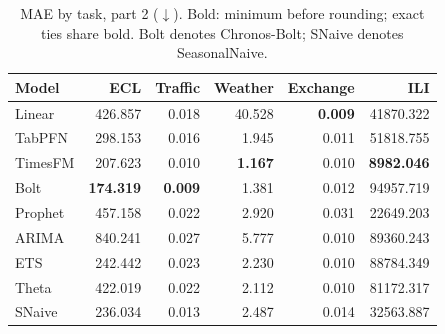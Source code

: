 \begin{table}[!htbp]
\centering
\caption{MAE by task, part 2 ($\downarrow$). Bold: minimum before rounding; exact ties share bold. Bolt denotes Chronos-Bolt; SNaive denotes SeasonalNaive.}
\label{tab:mae2}
\small
\setlength{\tabcolsep}{3.5pt}
\begin{tabular}{lrrrrr}
\hline
Model & ECL & Traffic & Weather & Exchange & ILI \\
\hline
Linear & 426.857 & 0.018 & 40.528 & \textbf{0.009} & 41870.322 \\
TabPFN & 298.153 & 0.016 & 1.945 & 0.011 & 51818.755 \\
TimesFM & 207.623 & 0.010 & \textbf{1.167} & 0.010 & \textbf{8982.046} \\
Bolt & \textbf{174.319} & \textbf{0.009} & 1.381 & 0.012 & 94957.719 \\
Prophet & 457.158 & 0.022 & 2.920 & 0.031 & 22649.203 \\
ARIMA & 840.241 & 0.027 & 5.777 & 0.010 & 89360.243 \\
ETS & 242.442 & 0.023 & 2.230 & 0.010 & 88784.349 \\
Theta & 422.019 & 0.022 & 2.112 & 0.010 & 81172.317 \\
SNaive & 236.034 & 0.013 & 2.487 & 0.014 & 32563.887 \\
\hline
\end{tabular}
\end{table}
